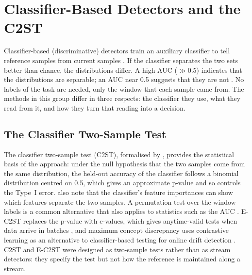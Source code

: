 \section{Classifier-Based Detectors and the C2ST}
\label{sec:lit-c2st}
Classifier-based (discriminative) detectors train an auxiliary classifier to tell reference samples from current samples \citep{LopezPazOquab2017, Pan2020}. If the classifier separates the two sets better than chance, the distributions differ. A high AUC ($\gg 0.5$) indicates that the distributions are separable; an AUC near 0.5 suggests that they are not \citep{Pan2020, Qian2021}. No labels of the task are needed, only the window that each sample came from. The methods in this group differ in three respects: the classifier they use, what they read from it, and how they turn that reading into a decision.

\subsection{The Classifier Two-Sample Test}
The classifier two-sample test (C2ST), formalised by \citet{LopezPazOquab2017}, provides the statistical basis of the approach: under the null hypothesis that the two samples come from the same distribution, the held-out accuracy of the classifier follows a binomial distribution centred on 0.5, which gives an approximate p-value and so controls the Type~I error. \citet{LopezPazOquab2017} also note that the classifier's feature importances can show which features separate the two samples. A permutation test over the window labels is a common alternative that also applies to statistics such as the AUC \citep{Good2005}. E-C2ST replaces the p-value with e-values, which gives anytime-valid tests when data arrive in batches \citep{EC2ST2024}, and maximum concept discrepancy uses contrastive learning as an alternative to classifier-based testing for online drift detection \citep{MCD2024}. C2ST and E-C2ST were designed as two-sample tests rather than as stream detectors: they specify the test but not how the reference is maintained along a stream.

